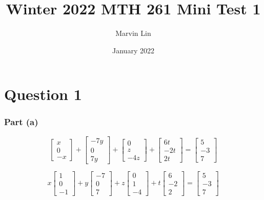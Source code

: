 \documentclass{report}
\title{Winter 2022 MTH 261 Mini Test 1}
\author{Marvin Lin}
\date{January 2022}
\begin{document}
\maketitle

\section*{Question 1}
\subsubsection*{Part (a)}
\begin{equation}
\begin{bmatrix} x \\ 0 \\ -x \end{bmatrix}
+
\begin{bmatrix} -7y \\ 0 \\ 7y \end{bmatrix}
+
\begin{bmatrix} 0 \\ z \\ -4z \end{bmatrix}
+
\begin{bmatrix} 6t \\ -2t \\ 2t \end{bmatrix}
=
\begin{bmatrix} 5 \\ -3 \\ 7 \end{bmatrix}
\end{equation}

\begin{equation}
x
\begin{bmatrix} 1 \\ 0 \\ -1 \end{bmatrix}
+
y
\begin{bmatrix} -7 \\ 0 \\ 7 \end{bmatrix}
+
z
\begin{bmatrix} 0 \\ 1 \\ -4 \end{bmatrix}
+
t
\begin{bmatrix} 6 \\ -2 \\ 2 \end{bmatrix}
=
\begin{bmatrix} 5 \\ -3 \\ 7 \end{bmatrix}
\end{equation}
\end{document}
